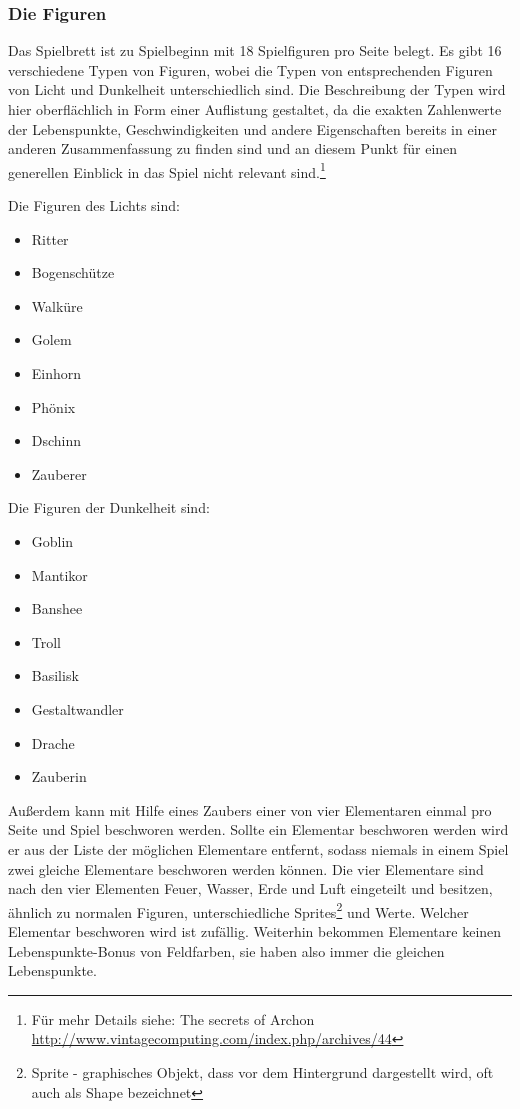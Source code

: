 \subsubsection{Die Figuren}
Das Spielbrett ist zu Spielbeginn mit 18 Spielfiguren pro Seite belegt. Es gibt 16 verschiedene Typen von Figuren, wobei die Typen von entsprechenden Figuren von Licht und Dunkelheit unterschiedlich sind. Die Beschreibung der Typen wird hier oberflächlich in Form einer Auflistung gestaltet, da die exakten Zahlenwerte der Lebenspunkte, Geschwindigkeiten und andere Eigenschaften bereits in einer anderen Zusammenfassung zu finden sind und an diesem Punkt für einen generellen Einblick in das Spiel nicht relevant sind.\footnote{Für mehr Details siehe: The secrets of Archon \url{http://www.vintagecomputing.com/index.php/archives/44}}
\begin{multicols}{2}
	Die Figuren des Lichts sind: 
	\begin{itemize}
		\item Ritter
		\item Bogenschütze
		\item Walküre
		\item Golem
		\item Einhorn
		\item Phönix
		\item Dschinn
		\item Zauberer
	\end{itemize}
\columnbreak
	Die Figuren der Dunkelheit sind:
	\begin{itemize}
		\item Goblin
		\item Mantikor
		\item Banshee
		\item Troll
		\item Basilisk
		\item Gestaltwandler
		\item Drache
		\item Zauberin
	\end{itemize}
\end{multicols}

Außerdem kann mit Hilfe eines Zaubers einer von vier Elementaren einmal pro Seite und Spiel beschworen werden. Sollte ein Elementar beschworen werden wird er aus der Liste der möglichen Elementare entfernt, sodass niemals in einem Spiel zwei gleiche Elementare beschworen werden können. Die vier Elementare sind nach den vier Elementen Feuer, Wasser, Erde und Luft eingeteilt und besitzen, ähnlich zu normalen Figuren, unterschiedliche Sprites\footnote{Sprite - graphisches Objekt, dass vor dem Hintergrund dargestellt wird, oft auch als Shape bezeichnet} und Werte. Welcher Elementar beschworen wird ist zufällig. Weiterhin bekommen Elementare keinen Lebenspunkte-Bonus von Feldfarben, sie haben also immer die gleichen Lebenspunkte.

